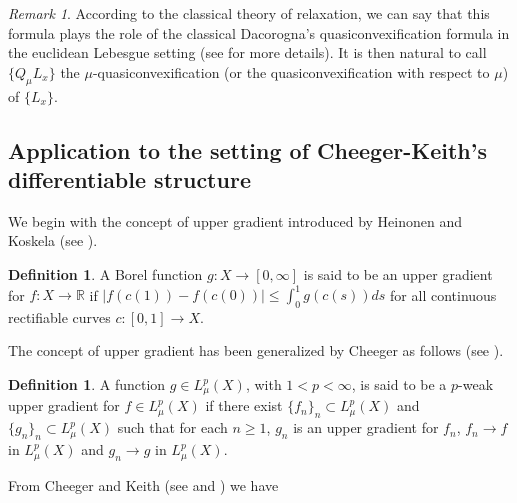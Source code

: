 \documentclass[10pt]{amsart}
\numberwithin{equation}{section}
\theoremstyle{definition}
\newtheorem{definition}[theorem]{Definition}
\theoremstyle{remark}
\newtheorem{remark}[theorem]{Remark}
\begin{document}
\begin{remark}
According to the classical theory of relaxation, we can say that this formula plays the role of the classical Dacorogna's quasiconvexification formula in the euclidean Lebesgue setting (see \cite{dacorogna08} for more details). It is then natural to call $\{Q_\mu L_x\}$ the $\mu$-quasiconvexification (or the quasiconvexification with respect to $\mu$) of $\{L_x\}$. 
\end{remark}

\subsection{Application to the setting of Cheeger-Keith's differentiable structure} We begin with the concept of upper gradient introduced by Heinonen and Koskela (see \cite{heinonen-koskela98}). 
\begin{definition}
A Borel function $g:X\to[0,\infty]$ is said to be an upper gradient for $f:X\to{{\mathbb R}}$  if 
$
|f(c(1))-f(c(0))|\leq\int_0^1 g(c(s))ds
$
for all continuous rectifiable curves $c:[0,1]\to X$. 
\end{definition}
The concept of upper gradient has been generalized by Cheeger as follows (see \cite[Definition 2.8]{cheeger99}). 
\begin{definition}
A function $g\in L^p_\mu(X)$, with $1<p<\infty$, is said to be a $p$-weak upper gradient for $f\in L^p_\mu(X)$ if there exist $\{f_n\}_n\subset L^p_\mu(X)$ and $\{g_n\}_n\subset L^p_\mu(X)$ such that for each $n\geq 1$, $g_n$ is an upper gradient for $f_n$, $f_n\to f$ in $L^p_\mu(X)$ and $g_n\to g$ in $L^p_\mu(X)$. 
\end{definition}
From Cheeger and Keith (see \cite[Theorem 4.38]{cheeger99} and \cite[Definition 2.1.1 and Theorem 2.3.1]{keith1-04}) we have
\end{document}
